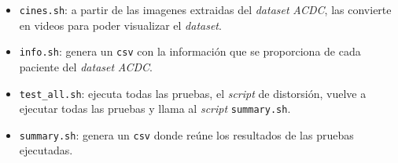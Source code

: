 \documentclass[12pt,a4paper]{article}
\begin{document}
\begin{itemize}
\begin{itemize}
\item \texttt{cines.sh}: a partir de las imagenes extraidas del \textit{dataset} \textit{ACDC}, las convierte en videos para poder visualizar el \textit{dataset}.

\item \texttt{info.sh}: genera un \texttt{csv} con la información que se proporciona de cada paciente del \textit{dataset} \textit{ACDC}.

\item \texttt{test\_all.sh}: ejecuta todas las pruebas, el \textit{script} de distorsión, vuelve a ejecutar todas las pruebas y llama al \textit{script} \texttt{summary.sh}.

\item \texttt{summary.sh}: genera un \texttt{csv} donde reúne los resultados de las pruebas ejecutadas.
\end{itemize}

\end{itemize}


\newpage
\nocite{*}
\renewcommand\refname{Bibliografía}





\printglossary[type=\acronymtype,style=long,title={Índice de acrónimos}]

\end{document}
